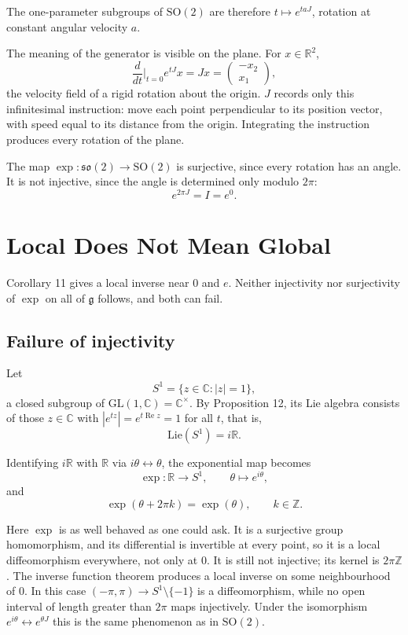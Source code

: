\documentclass[11pt]{article}
\begin{document}
The one-parameter subgroups of $\mathrm{SO}(2)$ are therefore $t \mapsto e^{taJ}$, rotation at constant angular velocity $a$.

The meaning of the generator is visible on the plane. For $x \in \mathbb{R}^2$,
\[
\frac{d}{dt}\Big|_{t=0} e^{tJ} x = Jx = \begin{pmatrix} -x_2 \\ x_1 \end{pmatrix},
\]
the velocity field of a rigid rotation about the origin. $J$ records only this infinitesimal instruction: move each point perpendicular to its position vector, with speed equal to its distance from the origin. Integrating the instruction produces every rotation of the plane.

The map $\exp : \mathfrak{so}(2) \to \mathrm{SO}(2)$ is surjective, since every rotation has an angle. It is not injective, since the angle is determined only modulo $2\pi$:
\[
e^{2\pi J} = I = e^{0}.
\]

\section{Local Does Not Mean Global}

Corollary 11 gives a local inverse near $0$ and $e$. Neither injectivity nor surjectivity of $\exp$ on all of $\mathfrak{g}$ follows, and both can fail.

\subsection{Failure of injectivity}

Let
\[
S^1 = \{ z \in \mathbb{C} : |z| = 1 \},
\]
a closed subgroup of $\mathrm{GL}(1, \mathbb{C}) = \mathbb{C}^\times$. By Proposition 12, its Lie algebra consists of those $z \in \mathbb{C}$ with $|e^{tz}| = e^{t \operatorname{Re} z} = 1$ for all $t$, that is,
\[
\mathrm{Lie}(S^1) = i\mathbb{R}.
\]

Identifying $i\mathbb{R}$ with $\mathbb{R}$ via $i\theta \leftrightarrow \theta$, the exponential map becomes
\[
\exp : \mathbb{R} \to S^1, \qquad \theta \longmapsto e^{i\theta},
\]
and
\[
\exp(\theta + 2\pi k) = \exp(\theta), \qquad k \in \mathbb{Z}.
\]

Here $\exp$ is as well behaved as one could ask. It is a surjective group homomorphism, and its differential is invertible at every point, so it is a local diffeomorphism everywhere, not only at $0$. It is still not injective; its kernel is $2\pi\mathbb{Z}$. The inverse function theorem produces a local inverse on some neighbourhood of $0$. In this case $(-\pi, \pi) \to S^1 \setminus \{-1\}$ is a diffeomorphism, while no open interval of length greater than $2\pi$ maps injectively. Under the isomorphism $e^{i\theta} \leftrightarrow e^{\theta J}$ this is the same phenomenon as in $\mathrm{SO}(2)$.
\end{document}
